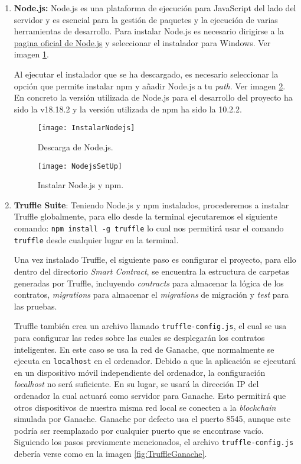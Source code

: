 \begin{enumerate}

\item \textbf{Node.js:} Node.js es una plataforma de ejecución para JavaScript del lado del servidor y es esencial para la gestión de paquetes y la ejecución de varias herramientas de desarrollo. 
Para instalar Node.js es necesario dirigirse a la \href{https://nodejs.org/en}{pagina oficial de Node.js} y seleccionar el instalador para Windows. Ver imagen \ref{fig:InstalarNodejs}.

Al ejecutar el instalador que se ha descargado, es necesario seleccionar la opción que permite instalar npm y añadir Node.js a tu \textit{path}. Ver imagen \ref{fig:NodejsSetUp}.  
En concreto la versión utilizada de Node.js para el desarrollo del proyecto ha sido la v18.18.2 y la versión utilizada de npm ha sido la 10.2.2.

\begin{figure}[h]
	\centering
	\texttt{[image: InstalarNodejs]}
	\caption[Descarga de Node.js]{Descarga de Node.js.}
	\label{fig:InstalarNodejs}
\end{figure}

\begin{figure}[h]
	\centering
	\texttt{[image: NodejsSetUp]}
	\caption[Instalar Node.js y npm]{Instalar Node.js y npm.}
	\label{fig:NodejsSetUp}
\end{figure}

\item \textbf{Truffle Suite}: Teniendo Node.js y npm instalados, procederemos a instalar Truffle globalmente, para ello desde la terminal ejecutaremos el siguiente comando: \texttt{npm install -g truffle} lo cual nos permitirá usar el comando \texttt{truffle} desde cualquier lugar en la terminal.

Una vez instalado Truffle, el siguiente paso es configurar el proyecto, para ello dentro del directorio \textit{Smart Contract}, se encuentra la estructura de carpetas generadas por Truffle, incluyendo \textit{contracts} para almacenar la lógica de los contratos, \textit{migrations} para almacenar el \textit{migrations} de migración y \textit{test} para las pruebas.

Truffle también crea un archivo llamado \texttt{truffle-config.js}, el cual se usa para configurar las redes sobre las cuales se desplegarán los contratos inteligentes.
En este caso se usa la red de Ganache, que normalmente se ejecuta en \texttt{localhost} en el ordenador. Debido a que la aplicación se ejecutará en un dispositivo móvil independiente del ordenador, la configuración \textit{localhost} no será suficiente. 
En su lugar, se usará la dirección IP del ordenador la cual actuará como servidor para Ganache. Esto permitirá que otros dispositivos de nuestra misma red local se conecten a la \textit{blockchain} simulada por Ganache.
Ganache por defecto usa el puerto 8545, aunque este podría ser reemplazado por cualquier puerto que se encontrase vacío.
Siguiendo los pasos previamente mencionados, el archivo \texttt{truffle-config.js} debería verse como en la imagen \ref{fig:TruffleGanache}.


\end{enumerate}
